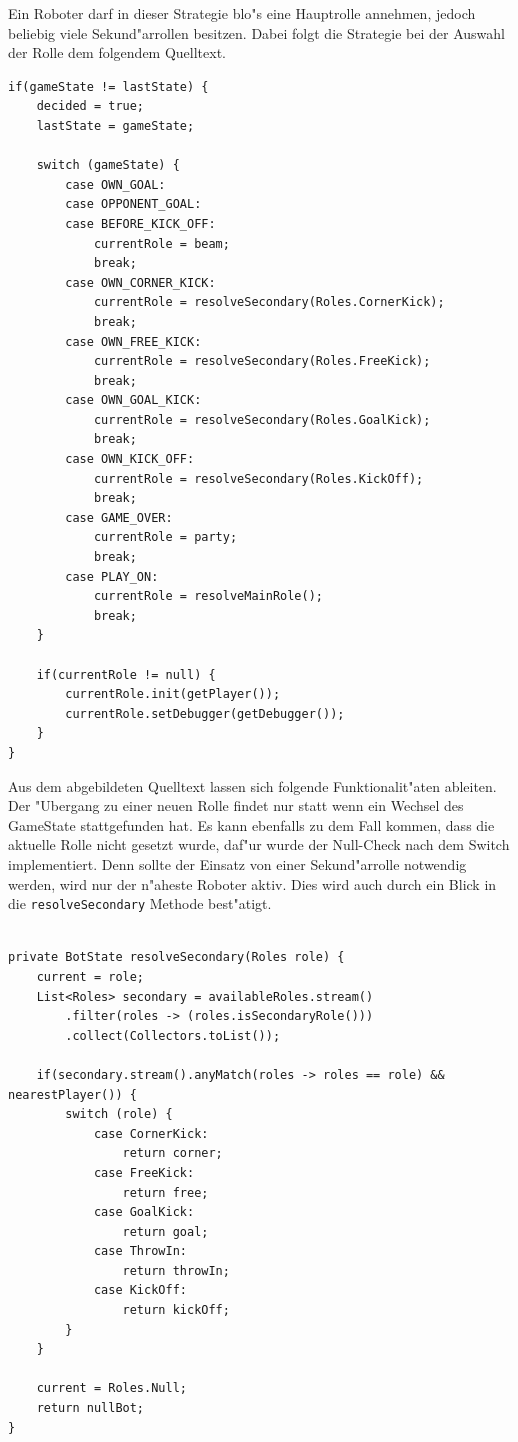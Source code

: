 \documentclass[fontsize=12pt,a4paper,final]{scrartcl}[2003/01/01]
\begin{document}
Ein Roboter darf in dieser Strategie blo"s eine Hauptrolle annehmen, jedoch beliebig viele Sekund"arrollen besitzen. Dabei folgt die Strategie bei der Auswahl der Rolle dem folgendem Quelltext.\\

\begin{lstlisting}[caption=Entscheidung zu einer Rolle, captionpos=b, label=EntscheidungRolleStrategie]
if(gameState != lastState) {
    decided = true;
    lastState = gameState;

    switch (gameState) {
        case OWN_GOAL:
        case OPPONENT_GOAL:
        case BEFORE_KICK_OFF:
            currentRole = beam;
            break;
        case OWN_CORNER_KICK:
            currentRole = resolveSecondary(Roles.CornerKick);
            break;
        case OWN_FREE_KICK:
            currentRole = resolveSecondary(Roles.FreeKick);
            break;
        case OWN_GOAL_KICK:
            currentRole = resolveSecondary(Roles.GoalKick);
            break;
        case OWN_KICK_OFF:
            currentRole = resolveSecondary(Roles.KickOff);
            break;
        case GAME_OVER:
            currentRole = party;
            break;
        case PLAY_ON:
            currentRole = resolveMainRole();
            break;
    }

    if(currentRole != null) {
        currentRole.init(getPlayer());
        currentRole.setDebugger(getDebugger());
    }
}
\end{lstlisting}

Aus dem abgebildeten Quelltext lassen sich folgende Funktionalit"aten ableiten. Der "Ubergang zu einer neuen Rolle findet nur statt wenn ein Wechsel des GameState stattgefunden hat. Es kann ebenfalls zu dem Fall kommen, dass die aktuelle Rolle nicht gesetzt wurde, daf"ur wurde der Null-Check nach dem Switch implementiert. Denn sollte der Einsatz von einer Sekund"arrolle notwendig werden, wird nur der n"aheste Roboter aktiv. Dies wird auch durch ein Blick in die \lstinline$resolveSecondary$ Methode best"atigt.\\
\\
\begin{lstlisting}[caption=resolveSecondary Methode der Strategie, captionpos=b, label=EntscheidungRolleStrategie]
private BotState resolveSecondary(Roles role) {
    current = role;
    List<Roles> secondary = availableRoles.stream()
        .filter(roles -> (roles.isSecondaryRole()))
        .collect(Collectors.toList());

    if(secondary.stream().anyMatch(roles -> roles == role) && nearestPlayer()) {
        switch (role) {
            case CornerKick:
                return corner;
            case FreeKick:
                return free;
            case GoalKick:
                return goal;
            case ThrowIn:
                return throwIn;
            case KickOff:
                return kickOff;
        }
    }

    current = Roles.Null;
    return nullBot;
}
\end{lstlisting}
\end{document}
